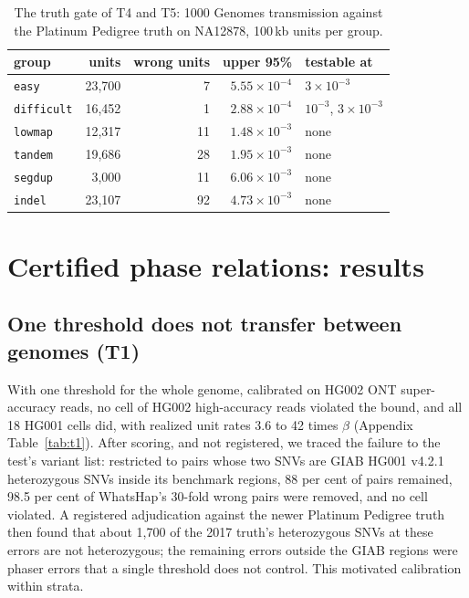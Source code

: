 \documentclass[11pt]{article}
\theoremstyle{definition}
\theoremstyle{remark}
\begin{document}
\begin{table}[t]
\centering\footnotesize
\begin{tabular}{@{}lrrrl@{}}
\toprule
group & units & wrong units & upper 95\% & testable at\\
\midrule
\texttt{easy} & 23{,}700 & 7 & $5.55\times10^{-4}$ & $3\times10^{-3}$\\
\texttt{difficult} & 16{,}452 & 1 & $2.88\times10^{-4}$ & $10^{-3}$, $3\times10^{-3}$\\
\texttt{lowmap} & 12{,}317 & 11 & $1.48\times10^{-3}$ & none\\
\texttt{tandem} & 19{,}686 & 28 & $1.95\times10^{-3}$ & none\\
\texttt{segdup} & 3{,}000 & 11 & $6.06\times10^{-3}$ & none\\
\texttt{indel} & 23{,}107 & 92 & $4.73\times10^{-3}$ & none\\
\bottomrule
\end{tabular}
\caption{The truth gate of T4 and T5: 1000 Genomes transmission against the
Platinum Pedigree truth on NA12878, 100\,kb units per group.}
\label{tab:gate}
\end{table}

\section{Certified phase relations: results}\label{sec:results}

\subsection{One threshold does not transfer between genomes (T1)}

With one threshold for the whole genome, calibrated on HG002 ONT
super-accuracy reads, no cell of HG002 high-accuracy reads violated the
bound, and all 18 HG001 cells did, with realized unit rates 3.6 to 42 times
$\beta$ (Appendix Table~\ref{tab:t1}). After scoring, and not registered,
we traced the failure to the test's variant list: restricted to pairs whose
two SNVs are GIAB HG001 v4.2.1 heterozygous SNVs inside its benchmark
regions, 88 per cent of pairs remained, 98.5 per cent of WhatsHap's 30-fold
wrong pairs were removed, and no cell violated. A registered adjudication
against the newer Platinum Pedigree truth then found that about 1{,}700 of
the 2017 truth's heterozygous SNVs at these errors are not heterozygous; the
remaining errors outside the GIAB regions were phaser errors that a single
threshold does not control. This motivated calibration within strata.
\end{document}
